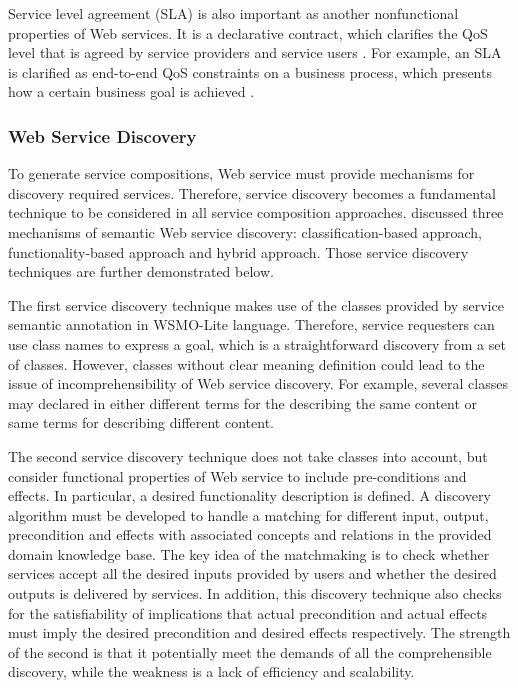 Service level agreement (SLA) is also important as another nonfunctional properties of Web services. It is a declarative contract, which clarifies the QoS level that is agreed by service providers and service users \cite{zhao2015toward}. For example,  an SLA is clarified as end-to-end QoS constraints on a business process,  which presents how a certain business goal is achieved \cite{wada2008multiobjective}.

\subsubsection{Web Service Discovery}\label{servicediscovery}
To generate service compositions, Web service must provide mechanisms for discovery required services. Therefore, service discovery becomes a fundamental technique to be considered in all service composition approaches. \cite{agarwal2009d5} discussed three mechanisms of semantic Web service discovery: classification-based approach, functionality-based approach and hybrid approach. Those service discovery techniques are further demonstrated below.

The first service discovery technique makes use of the classes provided by service semantic annotation in WSMO-Lite language. Therefore, service requesters can use class names to express a goal, which is a straightforward discovery from a set of classes. However, classes without clear meaning definition could lead to the issue of incomprehensibility of Web service discovery. For example, several classes may declared in either different terms for the describing the same content or same terms for describing different content.

The second service discovery technique  does not take classes into account, but consider functional properties of Web service to include pre-conditions and effects. In particular, a desired functionality description is defined. A discovery algorithm must be developed to handle a matching for different input, output, precondition and effects with associated concepts and relations in the provided domain knowledge base. The key idea of the matchmaking is to check whether services accept all the desired inputs provided by users and whether the desired outputs is delivered by services. In addition, this discovery technique also checks for the satisfiability of implications that actual precondition and actual effects must imply the desired precondition and desired effects respectively. The strength of the second is that it potentially meet the demands of all the comprehensible discovery, while the weakness is a lack of efficiency and scalability. 

